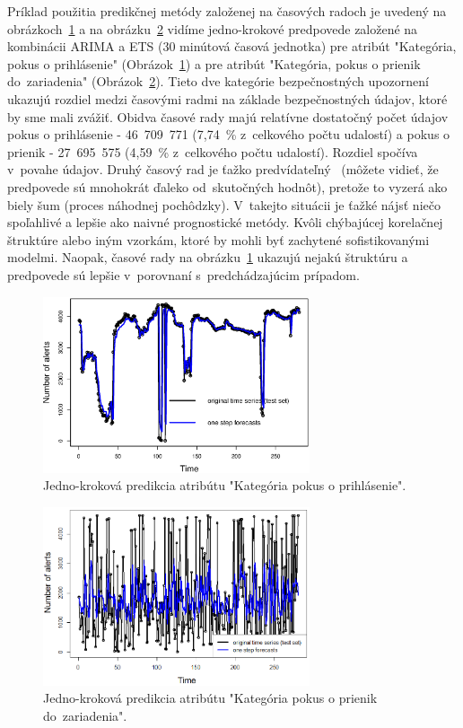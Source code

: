 \documentclass[thesismargins, thesislinespacing, openright, upjsfrontpage]{rnthesis}
\begin{document}
Príklad použitia predikčnej metódy založenej na časových radoch je uvedený na obrázkoch~\ref{fig:forecast_attempt_login} a na obrázku~\ref{fig:forecast_attempt_exploit} vidíme jedno-krokové predpovede založené na kombinácii ARIMA a ETS (30 minútová časová jednotka) pre atribút "Kategória, pokus o prihlásenie" (Obrázok~\ref{fig:forecast_attempt_login}) a pre atribút "Kategória, pokus o prienik do~zariadenia" (Obrázok~\ref{fig:forecast_attempt_exploit}). Tieto dve kategórie bezpečnostných upozornení ukazujú rozdiel medzi časovými radmi na základe bezpečnostných údajov, ktoré by sme mali zvážiť. Obidva časové rady majú relatívne dostatočný počet údajov pokus o prihlásenie - 46~709~771 (7,74~\% z~celkového počtu udalostí) a pokus o prienik - 27~695~575 (4,59~\% z~celkového počtu udalostí). Rozdiel spočíva v~povahe údajov. Druhý časový rad je ťažko predvídateľný~\cite{hendry1995dynamic} (môžete vidieť, že predpovede sú mnohokrát ďaleko od~skutočných hodnôt), pretože to vyzerá ako biely šum (proces náhodnej pochôdzky). V~takejto situácii je ťažké nájsť niečo spoľahlivé a lepšie ako naivné prognostické metódy. Kvôli chýbajúcej korelačnej štruktúre alebo iným vzorkám, ktoré by mohli byť zachytené sofistikovanými modelmi. Naopak, časové rady na obrázku~\ref{fig:forecast_attempt_login} ukazujú nejakú štruktúru a predpovede sú lepšie v~porovnaní s~predchádzajúcim prípadom.

\begin{figure}[h]
  \centering
  \includegraphics[width=0.7\textwidth]{images/item61_1step_forecasts_new.eps}
  \caption{Jedno-kroková predikcia atribútu "Kategória pokus o prihlásenie".} 
  \label{fig:forecast_attempt_login}
\end{figure}

\begin{figure}[h]
  \centering
  \includegraphics[width=0.7\textwidth]{images/item62_1step_forecasts_new.eps}
  \caption{Jedno-kroková predikcia atribútu "Kategória pokus o prienik do~zariadenia". }
  \label{fig:forecast_attempt_exploit}
\end{figure}
\end{document}
